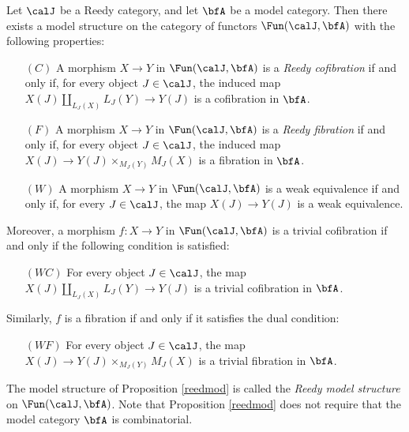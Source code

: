 \begin{Model Categories}
\begin{Didn't Read}
\begin{proposition}\label{reedmod}
Let $\calJ$ be a Reedy category, and let $\bfA$ be a model category.
Then there exists a model structure on the category of functors $\Fun(\calJ, \bfA)$
with the following properties:
\begin{itemize}
\item[$(C)$] A morphism $X \rightarrow Y$ in $\Fun(\calJ, \bfA)$ is a 
{\it Reedy cofibration} if and only if, for every object $J \in \calJ$, the induced map
$X(J) \coprod_{ L_{J}(X) } L_{J}(Y) \rightarrow Y(J)$ is a cofibration in $\bfA$.
\item[$(F)$] A morphism $X \rightarrow Y$ in $\Fun(\calJ, \bfA)$ is a
{\it Reedy fibration} if and only if, for every object $J \in \calJ$, the induced map
$X(J) \rightarrow Y(J) \times_{ M_{J}(Y) } M_{J}(X)$ is a fibration in $\bfA$.
\item[$(W)$] A morphism $X \rightarrow Y$ in $\Fun(\calJ, \bfA)$ is a weak equivalence if and only if, for every $J \in \calJ$, the map $X(J) \rightarrow Y(J)$ is a weak equivalence.
\end{itemize} 
Moreover, a morphism $f: X \rightarrow Y$ in $\Fun( \calJ, \bfA)$ is a trivial cofibration if
and only if the following condition is satisfied:
\begin{itemize}
\item[$(WC)$] For every object $J \in \calJ$, the map $X(J) \coprod_{ L_{J}(X) } L_{J}(Y) \rightarrow Y(J)$ is a trivial cofibration in $\bfA$.
\end{itemize}
Similarly, $f$ is a fibration if and only if it satisfies the dual condition:
\begin{itemize}
\item[$(WF)$] For every object $J \in \calJ$, the map $X(J) \rightarrow Y(J) \times_{ M_J(Y)} M_{J}(X)$ is a trivial fibration in $\bfA$.
\end{itemize}
\end{proposition}

The model structure of Proposition \ref{reedmod} is called the {\it Reedy model structure} on 
$\Fun(\calJ, \bfA)$. Note that Proposition \ref{reedmod} does not require that the model category $\bfA$ is combinatorial.


\end{Didn't Read}
\end{Model Categories}
